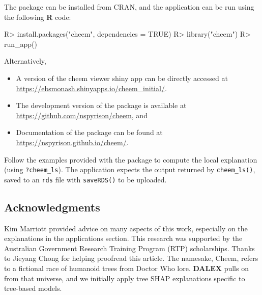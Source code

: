 \documentclass[
]{jss}
\providecommand{\tightlist}{%
  \setlength{\itemsep}{0pt}\setlength{\parskip}{0pt}}
\begin{document}
The package can be installed from CRAN, and the application can be run using the following \textbf{R} code:

\begin{CodeChunk}
\begin{CodeInput}
R> install.packages("cheem", dependencies = TRUE)
R> library("cheem")
R> run_app()
\end{CodeInput}
\end{CodeChunk}

Alternatively,

\begin{itemize}
\tightlist
\item
  A version of the cheem viewer shiny app can be directly accessed at
  \url{https://ebsmonash.shinyapps.io/cheem_initial/}.
\item
  The development version of the package is available at \url{https://github.com/nspyrison/cheem}, and
\item
  Documentation of the package can be found at \url{https://nspyrison.github.io/cheem/}.
\end{itemize}

Follow the examples provided with the package to compute the local explanation (using \texttt{?cheem\_ls}). The application expects the output returned by \texttt{cheem\_ls()}, saved to an \texttt{rds} file with \texttt{saveRDS()} to be uploaded.

\hypertarget{acknowledgments}{%
\subsection*{Acknowledgments}\label{acknowledgments}}

Kim Marriott provided advice on many aspects of this work, especially on the explanations in the applications section. This research was supported by the Australian Government Research Training Program (RTP) scholarships. Thanks to Jieyang Chong for helping proofread this article. The namesake, Cheem, refers to a fictional race of humanoid trees from Doctor Who lore. \textbf{DALEX} pulls on from that universe, and we initially apply tree SHAP explanations specific to tree-based models.

\renewcommand\refname{References}

\end{document}
